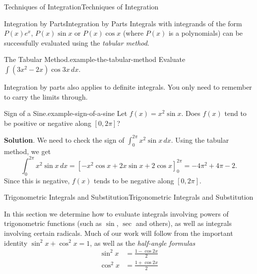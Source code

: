 \documentclass[10pt,]{book}
\numberwithin{equation}{section}
\begin{document}
\begin{chapterptx}{Techniques of Integration}{}{Techniques of Integration}{}{}
\begin{sectionptx}{Integration by Parts}{}{Integration by Parts}{}{}
\hypertarget{p-514}{}%
Integrals with integrands of the form \(P(x)e^{x}\), \(P(x)\sin x\) or \(P(x)\cos x\) (where \(P(x)\) is a polynomials) can be successfully evaluated using the \emph{tabular method}.%
\begin{example}{The Tabular Method.}{example-the-tabular-method}%
\hypertarget{p-515}{}%
Evaluate \(\int (3x^{2} - 2x)\cos3x\,dx\).%
\end{example}
\hypertarget{p-516}{}%
Integration by parts also applies to definite integrals. You only need to remember to carry the limits through.%
\begin{example}{Sign of a Sine.}{example-sign-of-a-sine}%
\hypertarget{p-517}{}%
Let \(f(x) = x^{2}\sin x\). Does \(f(x)\) tend to be positive or negative along \([0,2\pi]\)?%
\par\smallskip%
\noindent\textbf{Solution}.\hypertarget{solution-113}{}\quad%
\hypertarget{p-518}{}%
We need to check the sign of \(\int_{0}^{2\pi}x^{2}\sin x\,dx\). Using the tabular method, we get%
\begin{equation*}
\int_{0}^{2\pi}x^{2}\sin x\,dx = [-x^{2}\cos x + 2x\sin x + 2\cos x]_{0}^{2\pi} = -4\pi^{2} + 4\pi - 2.
\end{equation*}
Since this is negative, \(f(x)\) tends to be negative along \([0,2\pi]\).%
\end{example}
\end{sectionptx}
%
%
\typeout{************************************************}
\typeout{************************************************}
%
\begin{sectionptx}{Trigonometric Integrals and Substitution}{}{Trigonometric Integrals and Substitution}{}{}\label{section-trigonometric-integrals-and-substitution}
\begin{introduction}{}%
\hypertarget{p-519}{}%
In this section we determine how to evaluate integrals involving powers of trigonometric functions (such as \(\sin\), \(\sec\) and others), as well as integrals involving certain radicals. Much of our work will follow from the important identity \(\sin^{2}x + \cos^{2}x = 1\), as well as the \emph{half-angle formulas}%
\begin{align*}
\sin^{2}x & = \frac{1 - \cos2x}{2} \\
\cos^{2}x & = \frac{1 + \cos2x}{2} 
\end{align*}
%
\end{introduction}%
%
%
\typeout{************************************************}

\end{sectionptx}
\end{chapterptx}
\end{document}

